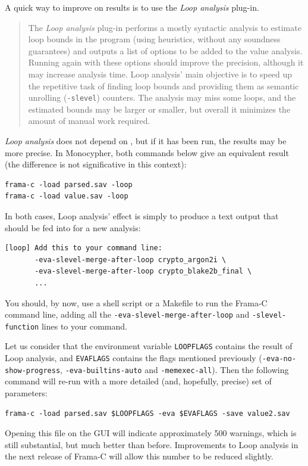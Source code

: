 
A quick way to improve on results is to use the \emph{Loop analysis}
plug-in.

\begin{quote}
The \emph{Loop analysis} plug-in performs a mostly syntactic analysis to
estimate loop bounds in the program (using heuristics, without any
soundness guarantees) and outputs a list of options to be added to the
value analysis. Running \Eva{} again with these options should improve the
precision, although it may increase analysis time. Loop analysis' main
objective is to speed up the repetitive task of finding loop bounds and
providing them as semantic unrolling (\texttt{-slevel}) counters. The
analysis may miss some loops, and the estimated bounds may be larger or
smaller, but overall it minimizes the amount of manual work required.
\end{quote}

\emph{Loop analysis} does not depend on \Eva{}, but if it has been run, the
results may be more precise. In Monocypher, both commands below give an
equivalent result (the difference is not significative in this context):

\begin{verbatim}
frama-c -load parsed.sav -loop
frama-c -load value.sav -loop
\end{verbatim}

In both cases, Loop analysis' effect is simply to produce a text output
that should be fed into \Eva{} for a new analysis:

\begin{verbatim}
[loop] Add this to your command line:
       -eva-slevel-merge-after-loop crypto_argon2i \
       -eva-slevel-merge-after-loop crypto_blake2b_final \
       ...
\end{verbatim}

You should, by now, use a shell script or a Makefile to run the Frama-C
command line, adding all the \texttt{-eva-slevel-merge-after-loop} and
\texttt{-slevel-function} lines to your command.

Let us consider that the environment variable \texttt{LOOPFLAGS}
contains the result of Loop analysis, and \texttt{EVAFLAGS} contains the
flags mentioned previously (\texttt{-eva-no-show-progress},
\texttt{-eva-builtins-auto} and \texttt{-memexec-all}). Then the
following command will re-run \Eva{} with a more detailed (and, hopefully,
precise) set of parameters:

\begin{verbatim}
frama-c -load parsed.sav $LOOPFLAGS -eva $EVAFLAGS -save value2.sav
\end{verbatim}

Opening this file on the GUI will indicate approximately 500 warnings,
which is still substantial, but much better than before. Improvements to
Loop analysis in the next release of Frama-C will allow this number to
be reduced slightly.
